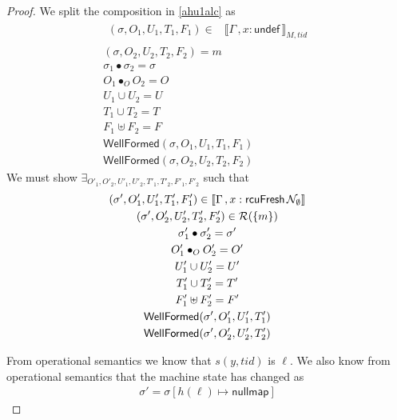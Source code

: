 \begin{proof}
We split the composition in  \ref{ahu1alc} as 
\begin{gather} \label{ahu11alc}
  \begin{aligned}
    (\sigma, O_{1}, U_{1}, T_{1},F_1 ) \in & \llbracket \Gamma\, , x:\textsf{undef} \, \rrbracket_{M,tid}  \end{aligned}\\
  \label{ahu12alc}
(\sigma, O_{2}, U_{2}, T_{2},F_2) = m
  \\
  \label{ahualcsig}
  \sigma_1 \bullet \sigma_2 = \sigma
  \\
\label{ahu13alc}
O_{1} \bullet_{O} O_{2} = O
\\
\label{ahu14alc}
U_{1} \cup U_{2} = U
\\
\label{ahu15alc}
T_{1} \cup T_{2} = T
\\
\label{ahualcF}
F_1 \uplus F_2 = F
\\
\label{ahu16alc}
\textsf{WellFormed}(\sigma,O_{1},U_{1},T_{1},F_1)
\\
\label{ahu17alc}
\textsf{WellFormed}(\sigma,O_{2},U_{2},T_{2},F_2)
\end{gather}
We must show $\exists_{O'_{1}, O'_{2}, U'_{1}, U'_{2}, T'_{1}, T'_{2},F'_1, F'_2}$ such that
\begin{gather}\label{phu5alc}
\begin{aligned}
(\sigma',O'_{1},U'_{1}, T'_{1},F'_1)  \in \llbracket \Gamma\,,  x:\textsf{rcuFresh} \, \mathcal{N}_{\emptyset}  \rrbracket 
\end{aligned}\\
\label{phu6alc}
(\sigma',O'_{2},U'_{2}, T'_{2},F'_2) \in \mathcal{R}(\{m\})
\\
\label{phualcsig}
\sigma'_1 \bullet \sigma'_2 = \sigma'
\\
\label{phu7alc}
O'_{1} \bullet_{O} O'_{2} = O'
\\
\label{phu8alc}
U'_{1} \cup U'_{2} = U'
\\
\label{phu9alc}
T'_{1} \cup T'_{2} = T'
\\
\label{phualcF}
F'_1 \uplus F'_2 = F'
\\
\label{phu10alc}
\textsf{WellFormed}(\sigma',O'_{1},U'_{1},T'_{1}) \\
\label{phu11alc}
\textsf{WellFormed}(\sigma',O'_{2},U'_{2},T'_{2})
\end{gather}

From operational semantics we know that $s(y,tid)$ is $\ell$. We also know from operational semantics that the machine state has changed as
\begin{gather}\label{ahusalc}
\sigma' =  \sigma[h(\ell) \mapsto \textsf{nullmap} ]
\end{gather}


\end{proof}
